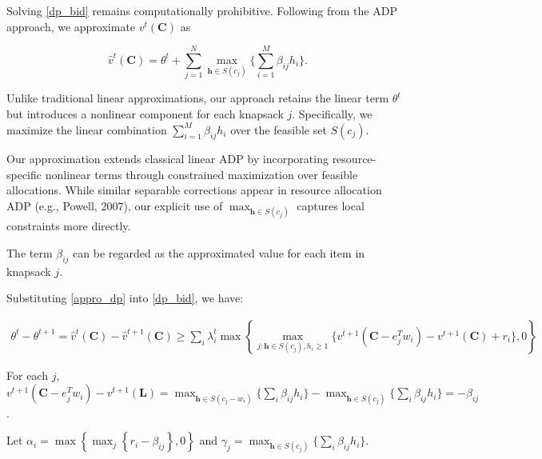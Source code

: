 Solving \eqref{dp_bid} remains computationally prohibitive. Following from the ADP approach, we approximate $v^{t}(\bm{C})$ as 

\begin{equation}\label{appro_dp}
    \hat{v}^{t}(\bm{C}) = \theta^{t} + \sum_{j=1}^{N} \max_{\bm{h} \in S(c_{j})} \{\sum_{i=1}^{M} \beta_{ij} h_{i}\}.
\end{equation}

Unlike traditional linear approximations, our approach retains the linear term $\theta^{t}$ but introduces a nonlinear component for each knapsack $j$. Specifically, we maximize the linear combination $\sum_{i=1}^{M} \beta_{ij} h_{i}$ over the feasible set $S(c_{j})$.

Our approximation extends classical linear ADP by incorporating resource-specific nonlinear terms through constrained maximization over feasible allocations. While similar separable corrections appear in resource allocation ADP (e.g., Powell, 2007), our explicit use of $\max_{\bm{h} \in S(c_j)}$ captures local constraints more directly.



The term $\beta_{ij}$ can be regarded as the approximated value for each item in knapsack $j$. 

Substituting \eqref{appro_dp} into \eqref{dp_bid}, we have:

\begin{align}
    \theta^{t} - \theta^{t+1} = \hat{v}^{t}(\bm{C}) - \hat{v}^{t+1}(\bm{C}) \geq \sum_{i} \lambda_{i}^{t} \max\left\{\max_{j:\bm{h} \in S(c_{j}), h_{i} \geqslant 1}\{v^{t+1}(\bm{C} - e_{j}^{T} w_{i}) - v^{t+1}(\bm{C}) + r_i\}, 0\right\}
\end{align}

For each $j$, $v^{t+1}(\bm{C} - e_{j}^{T} w_{i}) - v^{t+1}(\bm{L}) = \max_{\bm{h} \in S(c_{j}- w_{i})} \{\sum_{i} \beta_{ij} h_{i}\} - \max_{\bm{h} \in S(c_{j})} \{\sum_{i} \beta_{ij} h_{i}\} = -\beta_{ij}$.

Let $\alpha_{i} = \max\left\{\max_{j}\left\{r_i - \beta_{ij} \right\}, 0\right\}$ and $\gamma_{j} = \max_{\bm{h} \in S(c_{j})} \{\sum_{i} \beta_{ij} h_{i}\}$.
 
